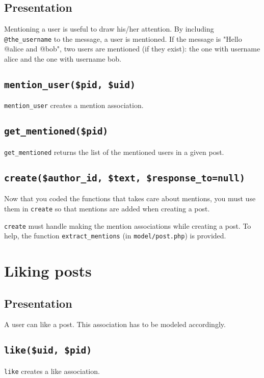 \documentclass[twoside,a4paper,12pt]{article}
\begin{document}
\subsection{Presentation}

Mentioning a user is useful to draw his/her attention. By including \texttt{@the\_username} to the message, a user is mentioned. If the message is "Hello @alice and @bob", two users are mentioned (if they exist): the one with username alice and the one with username bob.

\subsection{\texttt{mention\_user(\$pid, \$uid)}}
\texttt{mention\_user} creates a mention association.

\subsection{\texttt{get\_mentioned(\$pid)}}
\texttt{get\_mentioned} returns the list of the mentioned users in a given post.

\subsection{\texttt{create(\$author\_id, \$text, \$response\_to=null)}}
Now that you coded the functions that takes care about mentions, you must use them in \texttt{create} so that mentions are added when creating a post.

\texttt{create} must handle making the mention associations while creating a post. To help, the function \texttt{extract\_mentions} (in \texttt{model/post.php}) is provided.

\section{Liking posts}

\subsection{Presentation}
A user can like a post. This association has to be modeled accordingly.

\subsection{\texttt{like(\$uid, \$pid)}}
\texttt{like} creates a like association.
\end{document}
